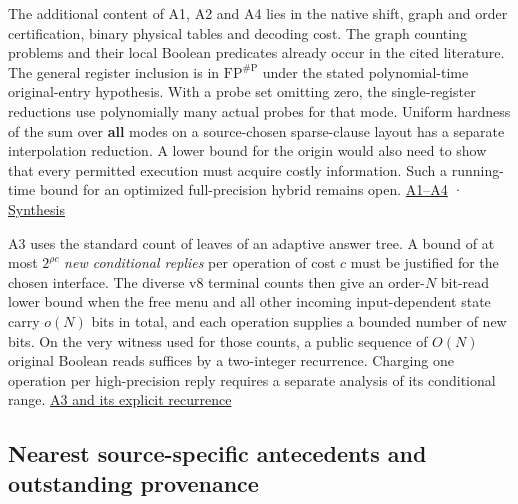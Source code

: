 \documentclass[
  11pt,
]{article}
\begin{document}
The additional content of A1, A2 and A4 lies in the native shift, graph
and order certification, binary physical tables and decoding cost. The
graph counting problems and their local Boolean predicates already occur
in the cited literature. The general register inclusion is in
\(\mathrm{FP}^{\#\mathrm P}\) under the stated polynomial-time
original-entry hypothesis. With a probe set omitting zero, the
single-register reductions use polynomially many actual probes for that
mode. Uniform hardness of the sum over \textbf{all} modes on a
source-chosen sparse-clause layout has a separate interpolation
reduction. A lower bound for the origin would also need to show that
every permitted execution must acquire costly information. Such a
running-time bound for an optimized full-precision hybrid remains open.
\hyperref[v9-section-acquisition-cost]{A1--A4} ·
\hyperref[v9-an-exact-value-can-be-hard-without-being-necessary]{Synthesis}

A3 uses the standard count of leaves of an adaptive answer tree. A bound
of at most \(2^{\rho c}\) \emph{new conditional replies} per operation
of cost \(c\) must be justified for the chosen interface. The diverse v8
terminal counts then give an order-\(N\) bit-read lower bound when the
free menu and all other incoming input-dependent state carry \(o(N)\)
bits in total, and each operation supplies a bounded number of new bits.
On the very witness used for those counts, a public sequence of \(O(N)\)
original Boolean reads suffices by a two-integer recurrence. Charging
one operation per high-precision reply requires a separate analysis of
its conditional range.
\hyperref[v9-a3-what-state-counting-prices-in-an-adaptive-execution]{A3 and
its explicit recurrence}

\subsection{Nearest source-specific antecedents and outstanding
provenance}\label{v9-nearest-source-specific-antecedents-and-outstanding-provenance}
\end{document}
